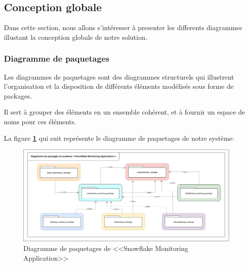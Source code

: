 \subsection{Conception globale}
    \par Dans cette section, nous allons s'intéresser à presenter les differents diagrammes illustant la conception globale de notre solution.
    \subsubsection{Diagramme de paquetages}
    \par Les diagrammes de paquetages sont des diagrammes structurels qui illustrent l'organisation et la disposition de différents éléments modélisés sous forme de packages\cite{diag_pack}.

    \par Il sert à grouper des éléments en un ensemble cohérent, et à fournir un espace de noms pour ces éléments.\par La figure \textbf{\ref{fig:e_a}} qui suit représente le diagramme de paquetages de notre système: 
            \begin{figure}[H]
            \centering
            \includegraphics[]{img/conception/diag_pack.png}
            \caption{Diagramme de paquetages de <<Snowflake Monitoring Application>>}
            \label{fig:e_a}
            \end{figure}

